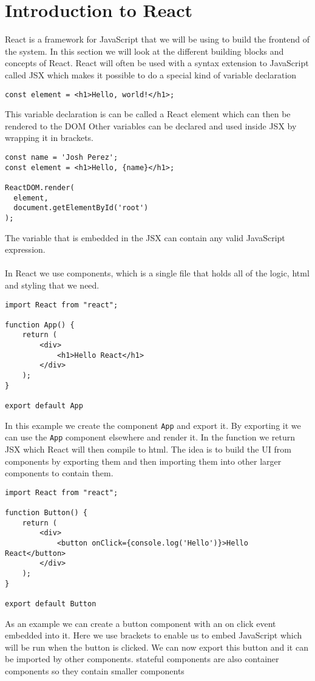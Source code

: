 \section{Introduction to React}
React is a framework for JavaScript that we will be using to build the frontend of the system. 
In this section we will look at the different building blocks and concepts of React.
React will often be used with a syntax extension to JavaScript called JSX which makes it possible to do a special kind of variable declaration

\begin{center}
    \texttt{const element = <h1>Hello, world!</h1>;}
\end{center}
This variable declaration is can be called a React element which can then be rendered to the DOM
Other variables can be declared and used inside JSX by wrapping it in brackets.

\begin{lstlisting}
const name = 'Josh Perez';
const element = <h1>Hello, {name}</h1>;

ReactDOM.render(
  element,
  document.getElementById('root')
);
\end{lstlisting}
The variable that is embedded in the JSX can contain any valid JavaScript expression.
\\\\
In React we use components, which is a single file that holds all of the logic, html and styling that we need.

\begin{lstlisting}
import React from "react";
    
function App() {
    return (
        <div>
            <h1>Hello React</h1>
        </div>
    );
}

export default App
\end{lstlisting}
In this example we create the component \texttt{App} and export it. By exporting it we can use the \texttt{App} component elsewhere and render it. 
In the function we return JSX which React will then compile to html.
The idea is to build the UI from components by exporting them and then importing them into other larger components to contain them. 
\begin{lstlisting}
import React from "react";
        
function Button() {
    return (
        <div>
            <button onClick={console.log('Hello')}>Hello React</button>
        </div>
    );
}
    
export default Button
\end{lstlisting}
As an example we can create a button component with an on click event embedded into it. 
Here we use brackets to enable us to embed JavaScript which will be run when the button is clicked.
We can now export this button and it can be imported by other components. 
stateful components are also container components so they contain smaller components


